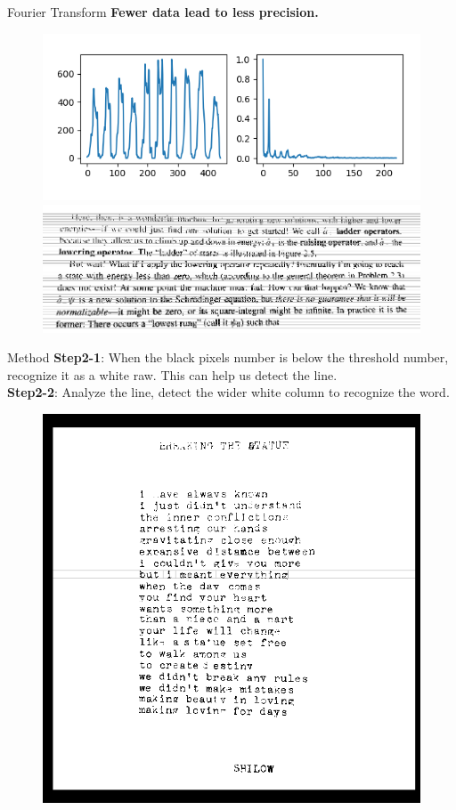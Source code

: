 \documentclass{beamer}
\begin{document}
\begin{frame}{Fourier Transform}
	\textbf{Fewer data lead to less precision.}
	\begin{figure}[H]
		\includegraphics[width=0.55\linewidth]{./fourier2.png}
		\includegraphics[width=0.70\linewidth]{./imgslice2.png}
	\end{figure}
\end{frame}

\begin{frame}{Method}
		\textbf{Step2-1}: When the black pixels number is below the threshold number, recognize it as a white raw. This can help us detect the line.\\
		\textbf{Step2-2}: Analyze the line, detect the wider white column to recognize the word.\\
		\begin{figure}[h]
			\centering
			\includegraphics[width=0.50\linewidth]{./raw_done.png}
		\end{figure}
\end{frame}
\end{document}
